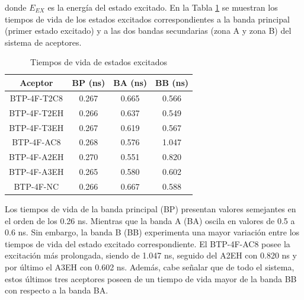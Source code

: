 donde $E_{EX}$ es la energía del estado excitado. En la Tabla \ref{table:R25B-12} se muestran los tiempos de vida de los estados excitados correspondientes a la banda principal (primer estado excitado) y a las dos bandas secundarias (zona A y zona B) del sistema de aceptores.
\begin{table}[H] %
\caption{Tiempos de vida de estados excitados}
\label{table:R25B-12} \vspace{-0.5cm}
\begin{center} 
\begin{tabular}{cccc}
\hline
Aceptor & BP (ns) & BA (ns) & BB (ns)  \\ \hline
BTP-4F-T2C8   & 0.267 & 0.665 & 0.566\\
BTP-4F-T2EH  & 0.266 & 0.637 & 0.549\\
BTP-4F-T3EH  & 0.267 & 0.619 & 0.567\\
BTP-4F-AC8  & 0.268 & 0.576  & 1.047\\
BTP-4F-A2EH  & 0.270 & 0.551 & 0.820 \\
BTP-4F-A3EH  & 0.265 & 0.580  & 0.602 \\
BTP-4F-NC & 0.266 & 0.667 & 0.588\\ \hline
\end{tabular}
\end{center}
\vspace{-0.2cm}
\end{table}
\noindent Los tiempos de vida de la banda principal (BP) presentan valores semejantes en el orden de los 0.26 ns. Mientras que la banda A (BA) oscila en valores de 0.5 a 0.6 ns. Sin embargo, la banda B (BB) experimenta una mayor variación entre los tiempos de vida del estado excitado correspondiente. El  BTP-4F-AC8 posee la excitación más prolongada, siendo de 1.047 ns, seguido del A2EH con 0.820 ns y por último el A3EH con 0.602 ns. Además, cabe señalar que de todo el sistema, estos últimos tres aceptores poseen de un tiempo de vida mayor de la banda BB con respecto a la banda BA. 

